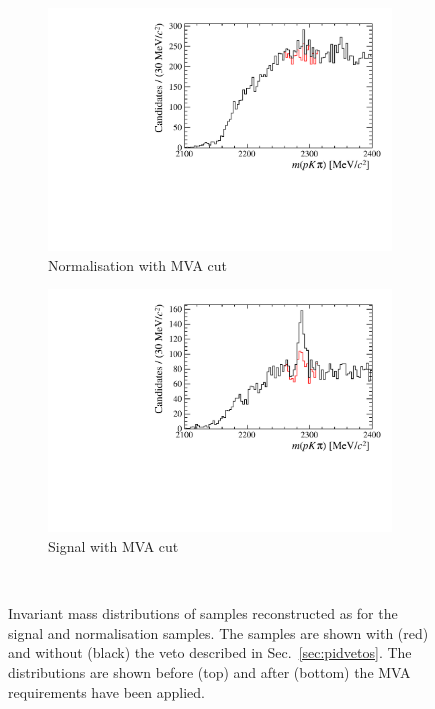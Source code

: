 \begin{figure}[!h]
\begin{subfigure}[t]{0.4\textwidth}
        \includegraphics[width=1.0\textwidth]{figs/Selection/B2DsD0_Ds2KKPi_Lc_Veto_WithBDT.pdf}
        \caption{Normalisation with MVA cut}
    \end{subfigure}%
    \begin{subfigure}[t]{0.4\textwidth}
        \includegraphics[width=1.0\textwidth]{figs/Selection/B2DsPhi_Ds2KKPi_Lc_Veto_WithBDT.pdf}
        \caption{Signal with MVA cut}
    \end{subfigure}\\
    \caption{Invariant mass distributions of \decay{\Dsp}{\Kp\Km\pip} samples reconstructed as \decay{\Lc}{\Pp\Km\pip} for the signal and normalisation samples. The samples are shown with (red) and without (black) the veto described in Sec.~\ref{sec:pidvetos}. The distributions are shown before (top) and after (bottom) the MVA requirements have been applied.}
    \label{fig:PIDVetos_Ds2KKPi_Lc_Veto}   
\end{figure}

